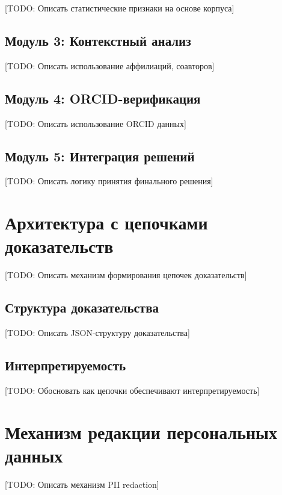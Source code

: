 [TODO: Описать статистические признаки на основе корпуса]

\subsection{Модуль 3: Контекстный анализ}
\label{subsec:method:contextual}

[TODO: Описать использование аффилиаций, соавторов]

\subsection{Модуль 4: ORCID-верификация}
\label{subsec:method:orcid}

[TODO: Описать использование ORCID данных]

\subsection{Модуль 5: Интеграция решений}
\label{subsec:method:integration}

[TODO: Описать логику принятия финального решения]

\section{Архитектура с цепочками доказательств}
\label{sec:method:evidence}

[TODO: Описать механизм формирования цепочек доказательств]

\subsection{Структура доказательства}
\label{subsec:method:evidence_structure}

[TODO: Описать JSON-структуру доказательства]

\subsection{Интерпретируемость}
\label{subsec:method:interpretability}

[TODO: Обосновать как цепочки обеспечивают интерпретируемость]

\section{Механизм редакции персональных данных}
\label{sec:method:redaction}

[TODO: Описать механизм PII redaction]

